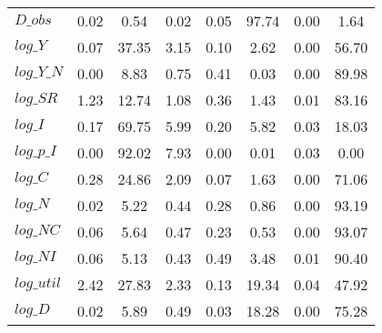 \begin{center}
\begin{longtable}{lccccccc}
$D\_obs     $	 & 	        0.02	 & 	        0.54	 & 	        0.02	 & 	        0.05	 & 	       97.74	 & 	        0.00	 & 	        1.64 \\ 
$log\_Y     $	 & 	        0.07	 & 	       37.35	 & 	        3.15	 & 	        0.10	 & 	        2.62	 & 	        0.00	 & 	       56.70 \\ 
$log\_Y\_N  $	 & 	        0.00	 & 	        8.83	 & 	        0.75	 & 	        0.41	 & 	        0.03	 & 	        0.00	 & 	       89.98 \\ 
$log\_SR    $	 & 	        1.23	 & 	       12.74	 & 	        1.08	 & 	        0.36	 & 	        1.43	 & 	        0.01	 & 	       83.16 \\ 
$log\_I     $	 & 	        0.17	 & 	       69.75	 & 	        5.99	 & 	        0.20	 & 	        5.82	 & 	        0.03	 & 	       18.03 \\ 
$log\_p\_I  $	 & 	        0.00	 & 	       92.02	 & 	        7.93	 & 	        0.00	 & 	        0.01	 & 	        0.03	 & 	        0.00 \\ 
$log\_C     $	 & 	        0.28	 & 	       24.86	 & 	        2.09	 & 	        0.07	 & 	        1.63	 & 	        0.00	 & 	       71.06 \\ 
$log\_N     $	 & 	        0.02	 & 	        5.22	 & 	        0.44	 & 	        0.28	 & 	        0.86	 & 	        0.00	 & 	       93.19 \\ 
$log\_NC    $	 & 	        0.06	 & 	        5.64	 & 	        0.47	 & 	        0.23	 & 	        0.53	 & 	        0.00	 & 	       93.07 \\ 
$log\_NI    $	 & 	        0.06	 & 	        5.13	 & 	        0.43	 & 	        0.49	 & 	        3.48	 & 	        0.01	 & 	       90.40 \\ 
$log\_util  $	 & 	        2.42	 & 	       27.83	 & 	        2.33	 & 	        0.13	 & 	       19.34	 & 	        0.04	 & 	       47.92 \\ 
$log\_D     $	 & 	        0.02	 & 	        5.89	 & 	        0.49	 & 	        0.03	 & 	       18.28	 & 	        0.00	 & 	       75.28 \\ 
\end{longtable}
 \end{center}
